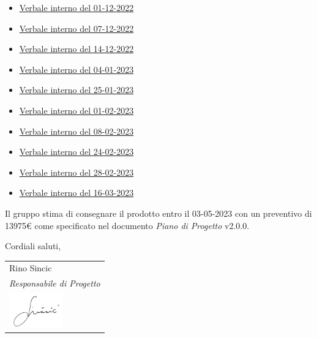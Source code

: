 \documentclass[10pt]{article}
\begin{document}
\begin{itemize}
  \item \href{https://github.com/7clickers/Documentazione-7clickers/blob/main/RTB/documentazione_interna/verbali/VI_2022-12-01.pdf}{Verbale interno del 01-12-2022}
  \item \href{https://github.com/7clickers/Documentazione-7clickers/blob/main/RTB/documentazione_interna/verbali/VI_2022-12-07.pdf}{Verbale interno del 07-12-2022}
  \item \href{https://github.com/7clickers/Documentazione-7clickers/blob/main/RTB/documentazione_interna/verbali/VI_2022-12-14.pdf}{Verbale interno del 14-12-2022}
  \item \href{https://github.com/7clickers/Documentazione-7clickers/blob/main/RTB/documentazione_interna/verbali/VI_2023-01-04.pdf}{Verbale interno del 04-01-2023}
  \item \href{https://github.com/7clickers/Documentazione-7clickers/blob/main/RTB/documentazione_interna/verbali/VI_2023-01-25.pdf}{Verbale interno del 25-01-2023}
  \item \href{https://github.com/7clickers/Documentazione-7clickers/blob/main/RTB/documentazione_interna/verbali/VI_2023-02-01.pdf}{Verbale interno del 01-02-2023}
  \item \href{https://github.com/7clickers/Documentazione-7clickers/blob/main/RTB/documentazione_interna/verbali/VI_2023-02-08.pdf}{Verbale interno del 08-02-2023}
  \item \href{https://github.com/7clickers/Documentazione-7clickers/blob/main/RTB/documentazione_interna/verbali/VI_2023-02-24.pdf}{Verbale interno del 24-02-2023}
  \item \href{https://github.com/7clickers/Documentazione-7clickers/blob/main/RTB/documentazione_interna/verbali/VI_2023-02-28.pdf}{Verbale interno del 28-02-2023}
  \item \href{https://github.com/7clickers/Documentazione-7clickers/blob/main/RTB/documentazione_interna/verbali/VI_2023-03-16.pdf}{Verbale interno del 16-03-2023}
\end{itemize}

Il gruppo stima di consegnare il prodotto entro il 03-05-2023 con un preventivo di 13975\euro{}  come
specificato nel documento \textit{Piano di Progetto} v2.0.0.


Cordiali saluti,

\vspace{15pt}

\hfill
\begin{tabular}{ l @{} }
Rino Sincic\\
\textit{Responsabile di Progetto}\\
\includegraphics[width=2.3cm]{images/Rino_Sincic_firma.png}
\end{tabular}
\end{document}
